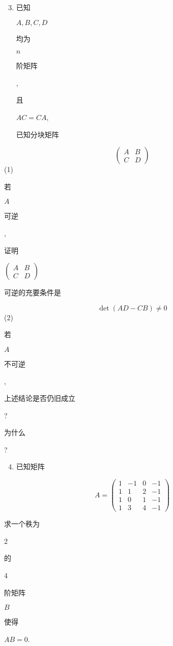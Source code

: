 \documentclass[10pt]{article}
\begin{document}
\begin{enumerate}
  \setcounter{enumi}{2}
  \item \begin{CJK}{UTF8}{mj}已知\end{CJK} $A, B, C, D$ \begin{CJK}{UTF8}{mj}均为\end{CJK} $n$ \begin{CJK}{UTF8}{mj}阶矩阵\end{CJK}, \begin{CJK}{UTF8}{mj}且\end{CJK} $A C=C A$, \begin{CJK}{UTF8}{mj}已知分块矩阵\end{CJK}
\end{enumerate}
$$
\left(\begin{array}{ll}
A & B \\
C & D
\end{array}\right)
$$
(1) \begin{CJK}{UTF8}{mj}若\end{CJK} $A$ \begin{CJK}{UTF8}{mj}可逆\end{CJK}, \begin{CJK}{UTF8}{mj}证明\end{CJK} $\left(\begin{array}{ll}A & B \\ C & D\end{array}\right)$ \begin{CJK}{UTF8}{mj}可逆的充要条件是\end{CJK}
$$
\operatorname{det}(A D-C B) \neq 0
$$
(2) \begin{CJK}{UTF8}{mj}若\end{CJK} $A$ \begin{CJK}{UTF8}{mj}不可逆\end{CJK}, \begin{CJK}{UTF8}{mj}上述结论是否仍旧成立\end{CJK}? \begin{CJK}{UTF8}{mj}为什么\end{CJK}?

\begin{enumerate}
  \setcounter{enumi}{3}
  \item \begin{CJK}{UTF8}{mj}已知矩阵\end{CJK}
\end{enumerate}
$$
A=\left(\begin{array}{cccc}
1 & -1 & 0 & -1 \\
1 & 1 & 2 & -1 \\
1 & 0 & 1 & -1 \\
1 & 3 & 4 & -1
\end{array}\right)
$$
\begin{CJK}{UTF8}{mj}求一个秩为\end{CJK} 2 \begin{CJK}{UTF8}{mj}的\end{CJK} 4 \begin{CJK}{UTF8}{mj}阶矩阵\end{CJK} $B$ \begin{CJK}{UTF8}{mj}使得\end{CJK} $A B=0$.
\end{document}
